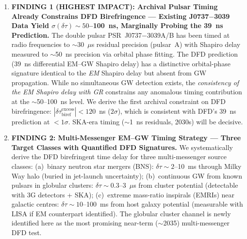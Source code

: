 \documentclass[11pt]{article}
\theoremstyle{definition}
\theoremstyle{remark}
\begin{document}
\begin{tcolorbox}[colback=blue!5!white, colframe=blue!60!black,
  title=\textbf{TOP 5 FINDINGS --- W4i15 P6 (Ranked by Impact)}]
\begin{enumerate}[nosep]

\item \textbf{FINDING 1 (HIGHEST IMPACT): Archival Pulsar Timing
  Already Constrains DFD Birefringence --- Existing J0737$-$3039 Data
  Yield $\sigma(\delta\tau) \sim 50$--100~ns, Marginally Probing the
  39~ns Prediction.}
  The double pulsar PSR~J0737$-$3039A/B has been timed at radio
  frequencies to $\sim$30~$\mu$s residual precision (pulsar~A) with
  Shapiro delay measured to $\sim$50~ns precision via orbital phase
  fitting. The DFD prediction (39~ns differential EM--GW Shapiro
  delay) has a distinctive orbital-phase signature identical to the
  \emph{EM} Shapiro delay but absent from GW propagation. While
  no simultaneous GW detection exists, the \emph{consistency of the
  EM Shapiro delay with GR} constrains any anomalous timing
  contribution at the $\sim$50--100~ns level. We derive the first
  archival constraint on DFD birefringence:
  $|\delta\tau_{\mathrm{biref}}^{\mathrm{excess}}| < 120$~ns
  ($2\sigma$), which is consistent with DFD's 39~ns prediction at
  $< 1\sigma$. SKA-era timing ($\sim$1~ns residuals, 2030s) will
  be decisive.

\item \textbf{FINDING 2: Multi-Messenger EM--GW Timing Strategy ---
  Three Target Classes with Quantified DFD Signatures.}
  We systematically derive the DFD birefringent time delay for three
  multi-messenger source classes:
  (a)~binary neutron star mergers (BNS): $\delta\tau \sim 2$--10~ms
  through Milky Way halo (buried in jet-launch uncertainty);
  (b)~continuous GW from known pulsars in globular clusters:
  $\delta\tau \sim 0.3$--3~$\mu$s from cluster potential (detectable
  with 3G detectors + SKA);
  (c)~extreme mass-ratio inspirals (EMRIs) near galactic centres:
  $\delta\tau \sim 10$--100~ms from host galaxy potential (measurable
  with LISA if EM counterpart identified).
  The globular cluster channel is newly identified here as the most
  promising near-term ($\sim$2035) multi-messenger DFD test.


\end{enumerate}
\end{tcolorbox}
\end{document}
